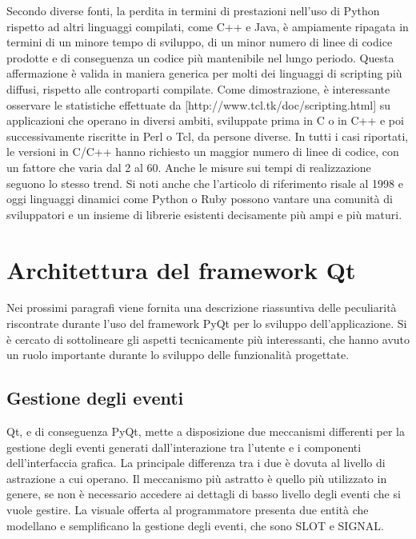 \documentclass[12pt]{toptesi}
\begin{document}
Secondo diverse fonti, la perdita in termini di prestazioni nell'uso di Python rispetto ad altri linguaggi compilati, come C++ e Java, è ampiamente ripagata in termini di un minore tempo di sviluppo, di un minor numero di linee di codice prodotte e di conseguenza un codice più mantenibile nel lungo periodo. Questa affermazione è valida in maniera generica per molti dei linguaggi di scripting più diffusi, rispetto alle controparti compilate. Come dimostrazione, è interessante osservare le statistiche effettuate da [http://www.tcl.tk/doc/scripting.html] su applicazioni che operano in diversi ambiti, sviluppate prima in C o in C++ e poi successivamente riscritte in Perl o Tcl, da persone diverse. In tutti i casi riportati, le versioni in C/C++ hanno richiesto un maggior numero di linee di codice, con un fattore che varia dal 2 al 60. Anche le misure sui tempi di realizzazione seguono lo stesso trend. Si noti anche che l'articolo di riferimento risale al 1998 e oggi linguaggi dinamici come Python o Ruby possono vantare una comunità di sviluppatori e un insieme di librerie esistenti decisamente più ampi e più maturi.

\section{Architettura del framework Qt}

Nei prossimi paragrafi viene fornita una descrizione riassuntiva delle peculiarità riscontrate durante l'uso del framework PyQt per lo sviluppo dell'applicazione. Si è cercato di sottolineare gli aspetti tecnicamente più interessanti, che hanno avuto un ruolo importante durante lo sviluppo delle funzionalità progettate.

\subsection{Gestione degli eventi}

Qt, e di conseguenza PyQt, mette a disposizione due meccanismi differenti per la gestione degli eventi generati dall'interazione tra l'utente e i componenti dell'interfaccia grafica. La principale differenza tra i due è dovuta al livello di astrazione a cui operano. Il meccanismo più astratto è quello più utilizzato in genere, se non è necessario accedere ai dettagli di basso livello degli eventi che si vuole gestire. La visuale offerta al programmatore presenta due entità che modellano e semplificano la gestione degli eventi, che sono SLOT e SIGNAL. 
\end{document}
